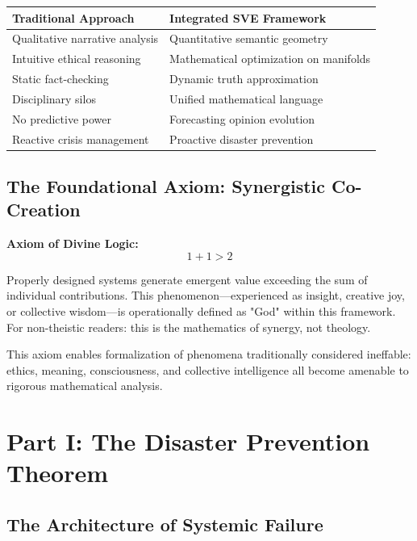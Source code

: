 \documentclass[11pt,a4paper]{article}
\theoremstyle{definition}
\theoremstyle{remark}
\begin{document}
\begin{small}
\begin{table}[h]
\centering
\begin{tabular}{|p{5.5cm}|p{5.5cm}|}
\hline
\textbf{Traditional Approach} & \textbf{Integrated SVE Framework} \\
\hline
Qualitative narrative analysis & Quantitative semantic geometry \\
Intuitive ethical reasoning & Mathematical optimization on manifolds \\
Static fact-checking & Dynamic truth approximation \\
Disciplinary silos & Unified mathematical language \\
No predictive power & Forecasting opinion evolution \\
Reactive crisis management & Proactive disaster prevention \\
\hline
\end{tabular}
\end{table}

\subsection{The Foundational Axiom: Synergistic Co-Creation}

\begin{mdframed}[backgroundcolor=blue!5]
\textbf{Axiom of Divine Logic:}
\begin{equation}
1 + 1 > 2
\label{eq:synergy}
\end{equation}

Properly designed systems generate emergent value exceeding the sum of individual contributions. This phenomenon—experienced as insight, creative joy, or collective wisdom—is operationally defined as "God" within this framework. For non-theistic readers: this is the mathematics of synergy, not theology.
\end{mdframed}

This axiom enables formalization of phenomena traditionally considered ineffable: ethics, meaning, consciousness, and collective intelligence all become amenable to rigorous mathematical analysis.

\section{Part I: The Disaster Prevention Theorem}

\subsection{The Architecture of Systemic Failure}


\end{small}
\end{document}
